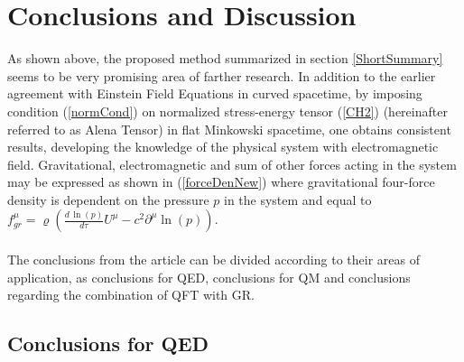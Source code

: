 \documentclass[aps,prx,preprint,groupedaddress,showkeys]{revtex4-2}
\newcommand{\mds}[1] {\frac{d {#1}}{d\tau}}
\begin{document}
\section{Conclusions and Discussion} \label{3Chap}

As shown above, the proposed method summarized in section \ref{ShortSummary} seems to be very promising area of farther research. In addition to the earlier agreement with Einstein Field Equations in curved spacetime, by imposing condition (\ref{normCond}) on normalized stress-energy tensor (\ref{CH2}) (hereinafter referred to as Alena Tensor) in flat Minkowski spacetime, one obtains consistent results, developing the knowledge of the physical system with electromagnetic field. Gravitational, electromagnetic and sum of other forces acting in the system may be expressed as shown in (\ref{forceDenNew}) where gravitational four-force density is dependent on the pressure $p$ in the system and equal to $f^{\mu}_{gr} = \varrho \left ( \mds{\, \ln{(p)}} U^{\mu} - c^2 \partial^{\mu} \ln{(p)} \right )$.\\ 
~\\
The conclusions from the article can be divided according to their areas of application, as conclusions for QED, conclusions for QM and conclusions regarding the combination of QFT with GR.

\subsection{Conclusions for QED}
\end{document}
